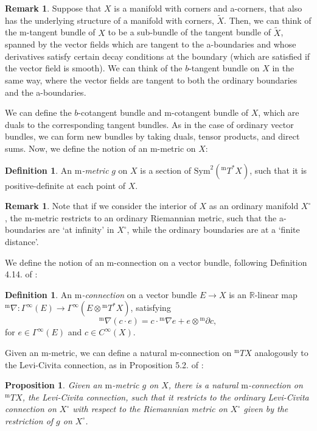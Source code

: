 \documentclass[10pt, a4paper]{article}
\theoremstyle{plain}%
\newtheorem{prop}[theorem]{Proposition}
\theoremstyle{definition}
\newtheorem{defn}[theorem]{Definition}
\newtheorem{rem}[theorem]{Remark}
\numberwithin{figure}{section}
\numberwithin{equation}{section}
\newcommand{\bR}{\mathbb{R}}
\newcommand{\pa}{\partial}
\newcommand{\rt}{\rightarrow}
\newcommand{\m}{\mathrm{m}}
\begin{document}
\begin{rem}
	Suppose that $X$ is a manifold with corners and a-corners, that also has the underlying structure of a manifold with corners, $\tilde{X}$. Then, we can think of the m-tangent bundle of $X$ to be a sub-bundle of the tangent bundle of $\tilde{X}$, spanned by the vector fields which are tangent to the a-boundaries and whose derivatives satisfy certain decay conditions at the boundary (which are satisfied if the vector field is smooth). We can think of the $b$-tangent bundle on $X$ in the same way, where the vector fields are tangent to both the ordinary boundaries and the a-boundaries.
\end{rem}


We can define the $b$-cotangent bundle and m-cotangent bundle of $X$, which are duals to the corresponding tangent bundles. As in the case of ordinary vector bundles, we can form new bundles by taking duals, tensor products, and direct sums. Now, we define the notion of an m-metric on $X$:
\begin{defn}
	An \textit{${\m}$-metric} $g$ on $X$ is a section of $\mathrm{Sym}^2(^{\m}T^*X)$, such that it is positive-definite at each point of $X$.
\end{defn}
\begin{rem}
	Note that if we consider the interior of $X$ as an ordinary manifold $X^\circ$, the m-metric restricts to an ordinary Riemannian metric, such that the a-boundaries are `at infinity' in $X^\circ$, while the ordinary boundaries are at a `finite distance'.
\end{rem}
We define the notion of an m-connection on a vector bundle, following Definition 4.14$.$ of \cite{Joy16}:
\begin{defn}
	An \textit{${\m}$-connection} on a vector bundle $E\rt X$ is an $\bR$-linear map $^{\m}\nabla : \Gamma^\infty(E)\rt\Gamma^\infty(E\otimes {^{\m}T}^*X)$, satisfying \[
	^{\m}\nabla(c\cdot e) = c\cdot {^{\m}\nabla e} + e\otimes {^{\m}\pa c},
	\]
	for $e\in \Gamma^\infty(E)$ and $c\in C^\infty(X)$.
\end{defn}
Given an m-metric, we can define a natural m-connection on $^{\m}TX$ analogously to the Levi-Civita connection, as in Proposition 5.2$.$ of \cite{Joy16}:
\begin{prop}
	Given an ${\m}$-metric $g$ on $X$, there is a natural ${\m}$-connection on $^{\m}TX$, the Levi-Civita connection, such that it restricts to the ordinary Levi-Civita connection on $X^\circ$ with respect to the Riemannian metric on $X^\circ$ given by the restriction of $g$ on $X^\circ$.
\end{prop}
\end{document}
